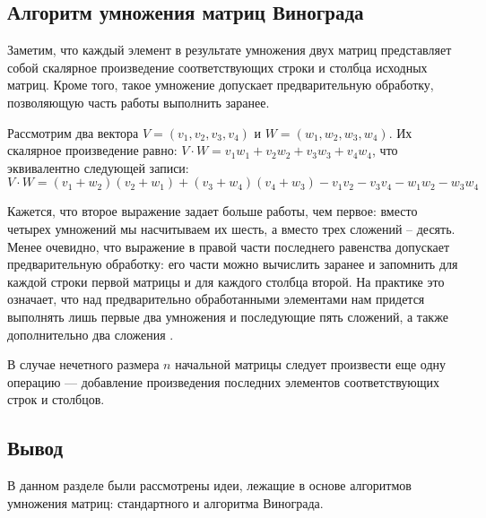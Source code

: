 \subsection{Алгоритм умножения матриц Винограда}

Заметим, что каждый элемент в результате умножения двух матриц представляет собой скалярное произведение соответствующих строки и столбца исходных матриц.
Кроме того, такое умножение допускает предварительную обработку, позволяющую часть работы выполнить заранее.

Рассмотрим два вектора $V = (v_1, v_2, v_3, v_4)$ и $W = (w_1, w_2, w_3, w_4)$.
Их скалярное произведение равно: $V \cdot W = v_1w_1 + v_2w_2 + v_3w_3 + v_4w_4$, что эквивалентно следующей записи:
\begin{equation}
	\label{for:new}
	V \cdot W = (v_1 + w_2)(v_2 + w_1) + (v_3 + w_4)(v_4 + w_3) - v_1v_2 - v_3v_4 - w_1w_2 - w_3w_4
\end{equation}

Кажется, что второе выражение задает больше работы, чем первое: вместо четырех умножений мы насчитываем их шесть, а вместо трех сложений -- десять. Менее очевидно, что выражение в правой части последнего равенства допускает предварительную обработку: его части можно вычислить заранее и запомнить для каждой строки первой матрицы и для каждого столбца второй. На практике это означает, что над предварительно обработанными элементами нам придется выполнять лишь первые два умножения и последующие пять сложений, а также дополнительно два сложения \cite{article_matrix_3}.

В случае нечетного размера $n$ начальной матрицы следует произвести еще одну операцию --- добавление произведения последних элементов соответствующих строк и столбцов.

\subsection*{Вывод}

В данном разделе были рассмотрены идеи, лежащие в основе алгоритмов умножения матриц: стандартного и алгоритма Винограда.
